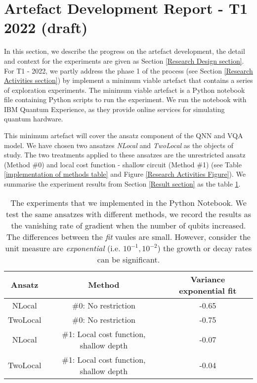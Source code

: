 \section{Artefact Development Report - T1 2022 (draft)}

In this section, we describe the progress on the artefact development, the detail and context for the experiments are given as Section \ref{Research Design section}.
For T1 - 2022, we partly address the phase 1 of the process (see Section \ref{Research Activities section}) by implement a minimum viable artefact that contains a series of exploration experiments.
The minimum viable artefact is a Python notebook file containing Python scripts to run the experiment.
We run the notebook with IBM Quantum Experience, as they provide online services for simulating quantum hardware.

This minimum artefact will cover the ansatz component of the QNN and VQA model.
We have chosen two ansatzes \emph{NLocal} and \emph{TwoLocal} as the objects of study.
The two treatments applied to these ansatzes are the unrestricted ansatz (Method \#0) and local cost function - shallow circuit (Method \#1) (see Table \ref{implementation of methods table} and Figure \ref{Research Activities Figure}).
We summarise the experiment results from Section \ref{Result section} as the table \ref{Experiment summary table}.

\begin{table}
    \centering
    \begin{tabular}{|| c c c ||}
        \hline
        Ansatz   & Method                                  & Variance exponential fit \\[0.5ex]
        \hline \hline
        NLocal   & \#0: No restriction                     & -0.65                    \\
        \hline
        TwoLocal & \#0: No restriction                     & -0.75                    \\
        \hline
        NLocal   & \#1: Local cost function, shallow depth & -0.07                    \\
        \hline
        TwoLocal & \#1: Local cost function, shallow depth & -0.04                    \\
        \hline
    \end{tabular}
    \caption{
        The experiments that we implemented in the Python Notebook. We test the same ansatzes with different methods, we record the results as the vanishing rate of gradient when the number of qubits increased.
        The differences between the \emph{fit} vaules are small.
        However, consider the unit measure are \emph{exponential} (i.e. $10^{-1}, 10^{-2}$) the growth or decay rates can be significant.
    }
    \label{Experiment summary table}
\end{table}












